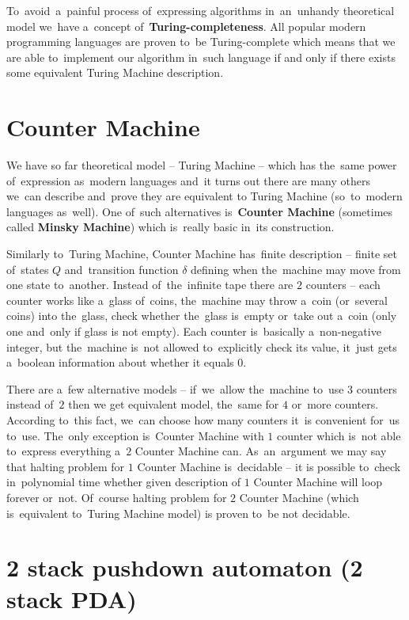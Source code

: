\documentclass[english,shortabstract,mgr]{iithesis}
\begin{document}
To~avoid~a~painful process of~expressing algorithms in~an~unhandy theoretical model we~have
a~concept of~\textbf{Turing-completeness}. All popular modern programming languages are proven
to~be Turing-complete which means that we are able to~implement our algorithm in~such
language if and only if there exists some equivalent Turing Machine description.

\section{Counter Machine}

We have so far theoretical model -- Turing Machine -- which has the~same power of~expression
as~modern languages and~it turns out there are many others we~can describe and~prove they are
equivalent to Turing Machine (so~to~modern languages as~well). One of~such alternatives
is~\textbf{Counter Machine} (sometimes called \textbf{Minsky Machine}) \cite{minsky_67}
which is~really basic in~its construction.

Similarly to~Turing Machine, Counter Machine has~finite description -- finite set of~states $Q$
and~transition function $\delta$ defining when the~machine may move from one state to~another.
Instead of~the~infinite tape there are $2$ counters -- each counter works like a~glass of~coins,
the~machine may throw a~coin (or~several coins) into the~glass, check whether the~glass is~empty
or~take out a~coin (only one and~only if glass is not empty). Each counter is~basically a~non-negative
integer, but the~machine is~not allowed to~explicitly check its value, it~just gets a~boolean
information about whether it equals $0$.

There are a~few alternative models -- if~we~allow the~machine to~use $3$ counters instead of~$2$
then we get equivalent model, the~same for $4$ or~more counters. According to~this fact, we~can
choose how many counters it~is convenient for~us to~use. The~only exception is~Counter Machine with
$1$ counter which is~not able to~express everything a~$2$ Counter Machine can. As~an~argument
we may say that halting problem for $1$ Counter Machine is~decidable -- it is possible to~check
in~polynomial time whether given description of $1$ Counter Machine will loop forever or~not.
Of~course halting problem for $2$ Counter Machine (which is~equivalent to~Turing Machine model)
is proven to~be not decidable. \cite{minsky_67}

\section {2 stack pushdown automaton (2 stack PDA)}
\end{document}
